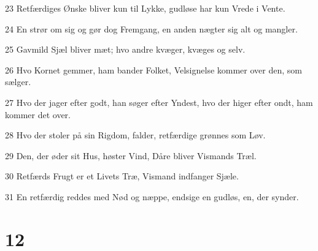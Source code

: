 \par 23 Retfærdiges Ønske bliver kun til Lykke, gudløse har kun Vrede i Vente.
\par 24 En strør om sig og gør dog Fremgang, en anden nægter sig alt og mangler.
\par 25 Gavmild Sjæl bliver mæt; hvo andre kvæger, kvæges og selv.
\par 26 Hvo Kornet gemmer, ham bander Folket, Velsignelse kommer over den, som sælger.
\par 27 Hvo der jager efter godt, han søger efter Yndest, hvo der higer efter ondt, ham kommer det over.
\par 28 Hvo der stoler på sin Rigdom, falder, retfærdige grønnes som Løv.
\par 29 Den, der øder sit Hus, høster Vind, Dåre bliver Vismands Træl.
\par 30 Retfærds Frugt er et Livets Træ, Vismand indfanger Sjæle.
\par 31 En retfærdig reddes med Nød og næppe, endsige en gudløs, en, der synder.

\chapter{12}

